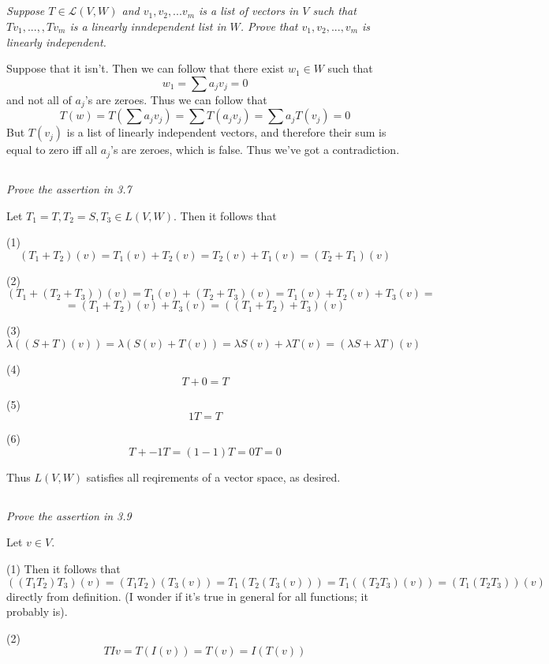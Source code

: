 \documentclass[11pt,oneside,titlepage]{book}
\begin{document}
\subsection{}
\textit{Suppose $T \in \mathcal{L}(V, W)$ and $v_1, v_2, ... v_m$ is a list of vectors in $V$
  such that $T v_1, ...,, T v_m$ is a linearly inndependent list in $W$. Prove that
$v_1, v_2, ..., v_m$ is linearly independent.}

Suppose that it isn't. Then we can follow that there exist $w_1 \in W$ such that
$$w_1 = \sum a_j v_j = 0$$
and not all of $a_j$'s are zeroes. Thus we can follow that
$$T(w) = T(\sum a_j v_j) = \sum T (a_j v_j) = \sum a_j T (v_j) = 0$$
But $T(v_j)$ is a list of linearly independent vectors, and therefore their sum is
equal to zero iff all $a_j$'s are zeroes, which is false. Thus we've got a contradiction.

\subsection{}
\textit{Prove the assertion in 3.7}

Let $T_1 = T, T_2 = S, T_3 \in L(V, W)$. Then it follows that

(1) $$(T_1 + T_2)(v) = T_1(v) + T_2(v) = T_2(v) + T_1(v) = (T_2 + T_1)(v)$$

(2) $$(T_1 + (T_2 + T_3))(v) = T_1(v) + (T_2 + T_3)(v) = T_1(v) + T_2(v) + T_3(v) =$$
$$ = (T_1 + T_2)(v) + T_3(v) = ((T_1 + T_2) + T_3)(v)$$

(3) $$\lambda((S + T)(v)) = \lambda ( S(v) + T(v)) = \lambda S(v) + \lambda T(v)
= (\lambda S + \lambda T)(v)$$

(4) $$T + 0 = T$$

(5) $$1T = T$$

(6) $$T + -1T = (1 - 1)T = 0T = 0$$

Thus $L(V, W)$ satisfies all reqirements of a vector space, as desired.

\subsection{}
\textit{Prove the assertion in 3.9}

Let $v \in V$.

(1) Then it follows that
$$((T_1 T_2)T_3)(v) = (T_1 T_2)( T_3(v)) =  T_1 (T_2( T_3(v))) = T_1 ((T_2 T_3)(v))
= (T_1(T_2 T_3))(v)$$
directly from definition. (I wonder if it's  true in general for all functions; it probably
is).

(2)
$$ TI v = T(I(v)) = T(v) = I (T(v))$$
\end{document}
